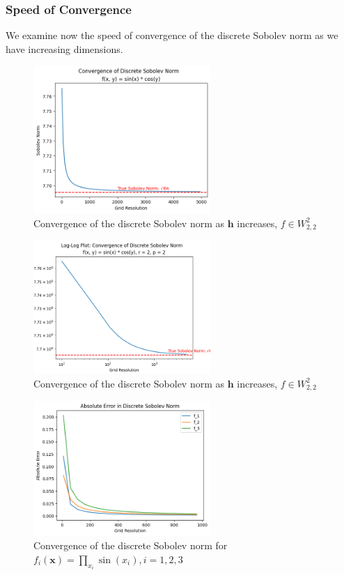 \documentclass[11pt,a4paper]{article}
\theoremstyle{plain}
\theoremstyle{definition}
\theoremstyle{remark}
\begin{document}
\subsubsection{Speed of Convergence}

We examine now the speed of convergence of the discrete Sobolev norm as we have increasing dimensions.

\begin{figure}[h]
    \centering
    \includegraphics[width=0.6\textwidth]{diags/convergence.png}
    \caption{Convergence of the discrete Sobolev norm as \( \mathbf{h} \) increases, \(f \in W^{2}_{2,2}\) }
    \label{fig:convergence}
\end{figure}
\begin{figure}[h]
    \centering
    \includegraphics[width=0.6\textwidth]{diags/LogLog-Convergence.png}
    \caption{Convergence of the discrete Sobolev norm as \( \mathbf{h} \) increases, \(f \in W^{2}_{2,2}\) }
    \label{fig:convergence}
\end{figure}

\begin{figure}[h]
    \centering
    \includegraphics[width=0.6\textwidth]{diags/sob_dims.png}
    \caption{Convergence of the discrete Sobolev norm for \(f_{i}(\mathbf{x} ) = \prod_{x_{i}} \sin(x_{i}), i = 1,2,3\) }
    \label{fig:}
\end{figure}
\end{document}
